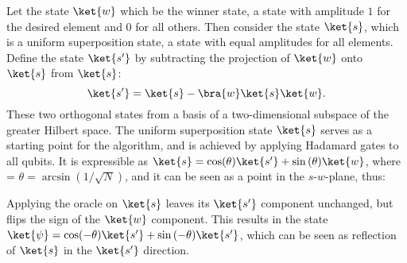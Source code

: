 Let the state $\ket{w}$ which be the winner state, a state with amplitude $1$ for the desired element and $0$ for all others.
Then consider the state $\ket{s}$, which is a uniform superposition state, a state with equal amplitudes for all elements.
Define the state $\ket{s'}$ by subtracting the projection of $\ket{w}$ onto $\ket{s}$ from $\ket{s}$:
\begin{equation}
    \label{eq:grover_s'}
    \ket{s'} = \ket{s} - \bra{w}\ket{s}\ket{w}.
\end{equation}
These two orthogonal states from a basis of a two-dimensional subspace of the greater Hilbert space.
The uniform superposition state $\ket{s}$ serves as a starting point for the algorithm, and is achieved by applying Hadamard gates to all qubits.
It is expressible as $\ket{s} = \cos(\theta)\ket{s'} + \sin{(\theta)}\ket{w}$, where = $\theta=\arcsin(1/\sqrt{N})$, and it can be seen as a point in the $s$-$w$-plane, thus:
\begin{center}
\end{center}

Applying the oracle on $\ket{s}$ leaves its $\ket{s'}$ component unchanged, but flips the sign of the $\ket{w}$ component.
This results in the state $\ket{\psi} = \cos(-\theta)\ket{s'} + \sin{(-\theta)}\ket{s'}$, which can be seen as reflection of $\ket{s}$ in the $\ket{s'}$ direction.


